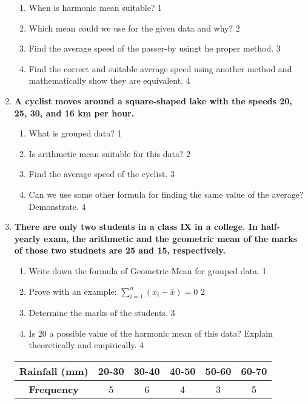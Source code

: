 \documentclass[a4paper,oneside]{book}
\begin{document}
\begin{enumerate}
  \begin{enumerate}
    \item
	When is harmonic mean suitable? \hfill 1
    \item
	Which mean could we use for the given data and why? \hfill 2
    \item  
	Find the average speed of the passer-by usingt he proper method. \hfill 3
    \item
	Find the correct and suitable average speed using another method and mathematically show they are equivalent. \hfill 4
  \end{enumerate}

 \item
	  \textbf{A cyclist moves around a square-shaped lake with the speeds 20, 25, 30, and 16 km per hour.} 
  
  \begin{enumerate}
    \item
	What is grouped data? \hfill 1
    \item
	Is arithmetic mean suitable for this data? \hfill 2
    \item  
	Find the average speed of the cyclist. \hfill 3
    \item
	Can we use some other formula for finding the same value of the average? Demonstrate. \hfill 4
  \end{enumerate}
  
     \item
	  \textbf{There are only two students in a class IX in a college. In half-yearly exam, the arithmetic and the geometric mean of the marks of those two studnets are 25 and 15, respectively.} 
  
  \begin{enumerate}
    \item
	Write down the formula of Geometric Mean for grouped data. \hfill 1
	\item Prove with an example: $\displaystyle \sum_{i=1}^n (x_i-\bar x) = 0$ \hfill 2
    \item  
	Determine the marks of the students. \hfill 3
    \item
	Is 20 a possible value of the harmonic mean of this data? Explain theoretically and empirically. \hfill 4
  \end{enumerate}

\begin{table}[h]
\centering
\begin{tabular}{c|c|c|c|c|c}
\textbf{Rainfall (mm)} & 20-30 & 30-40 & 40-50 & 50-60 & 60-70 \\ \hline
\textbf{Frequency} & 5 & 6 & 4 & 3 & 5
\end{tabular}
\end{table}
\end{enumerate}
\end{document}
